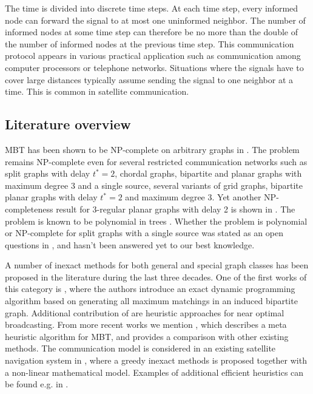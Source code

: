 The time is divided into discrete time steps.
At each time step, every informed node can forward the signal to at most one uninformed neighbor.
The number of informed nodes at some time step can therefore be no more than the double of the number of informed nodes at the previous time step.
This communication protocol appears in various practical application such as communication among computer processors or telephone networks.
Situations where the signals have to cover large distances typically assume sending the signal to one neighbor at a time.
This is common in satellite communication.

\subsection{Literature overview}

MBT has been shown to be NP-complete on arbitrary graphs in \cite{slater81}. 
The problem remains NP-complete even for several restricted communication networks \cite{jansen95} such as
split graphs with delay $t^*=2$, chordal graphs,
bipartite and planar graphs with maximum degree 3 and a single source,
several variants of grid graphs,
bipartite planar graphs with delay $t^*=2$ and maximum degree 3. 
Yet another NP-completeness result for 3-regular planar graphs with delay 2 is shown in \cite{middendorf93}.
The problem is known to be polynomial in trees \cite{slater81}.
Whether the problem is polynomial or NP-complete for split graphs with a single source was stated as an open questions in \cite{jansen95}, and hasn't been answered yet to our best knowledge.

A number of inexact methods for both general and special graph classes has been proposed in the literature during the last three decades.
One of the first works of this category is \cite{scheuermann84}, 
where the authors introduce an exact dynamic programming algorithm based on generating all maximum matchings in an induced bipartite graph.
Additional contribution of \cite{scheuermann84} are heuristic approaches for near optimal broadcasting.
From more recent works we mention \cite{hasson04}, which describes a meta heuristic algorithm for MBT, and provides a comparison with other existing methods.
The communication model is considered in an existing satellite navigation system in \cite{chu17}, where a greedy inexact methods is proposed together with a non-linear mathematical model.
Examples of additional efficient heuristics can be found e.g. in \cite{harutyunyan06,harutyunyan14,wang10,jimborean13}.

